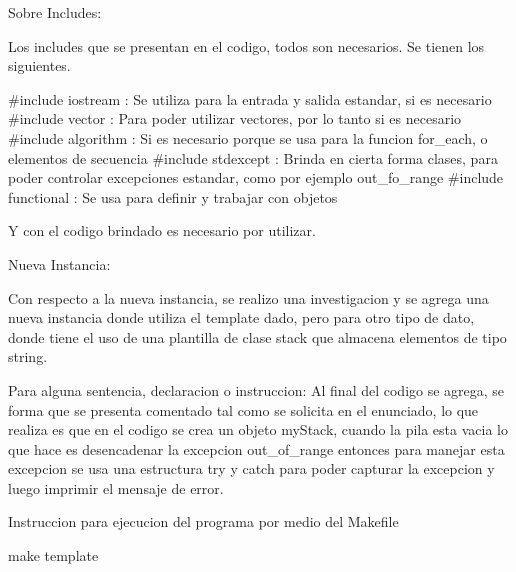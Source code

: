 Sobre Includes\+:

Los includes que se presentan en el codigo, todos son necesarios. Se tienen los siguientes.

\#include iostream \+: Se utiliza para la entrada y salida estandar, si es necesario \#include vector \+: Para poder utilizar vectores, por lo tanto si es necesario \#include algorithm \+: Si es necesario porque se usa para la funcion for\+\_\+each, o elementos de secuencia \#include stdexcept \+: Brinda en cierta forma clases, para poder controlar excepciones estandar, como por ejemplo out\+\_\+fo\+\_\+range \#include functional \+: Se usa para definir y trabajar con objetos

Y con el codigo brindado es necesario por utilizar.

Nueva Instancia\+:

Con respecto a la nueva instancia, se realizo una investigacion y se agrega una nueva instancia donde utiliza el template dado, pero para otro tipo de dato, donde tiene el uso de una plantilla de clase stack que almacena elementos de tipo string.

Para alguna sentencia, declaracion o instruccion\+: Al final del codigo se agrega, se forma que se presenta comentado tal como se solicita en el enunciado, lo que realiza es que en el codigo se crea un objeto my\+Stack, cuando la pila esta vacia lo que hace es desencadenar la excepcion out\+\_\+of\+\_\+range entonces para manejar esta excepcion se usa una estructura try y catch para poder capturar la excepcion y luego imprimir el mensaje de error.

Instruccion para ejecucion del programa por medio del Makefile

make template 